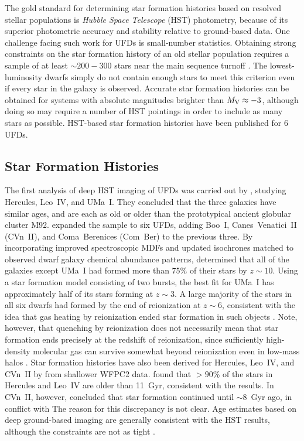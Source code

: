 \documentclass[a4paper]{ar-1col}
\begin{document}
The gold standard for determining star formation histories based on
resolved stellar populations is \emph{Hubble Space Telescope} (HST)
photometry, because of its superior photometric accuracy and stability
relative to ground-based data.  One challenge facing such work for
UFDs is small-number statistics.  Obtaining strong constraints on the
star formation history of an old stellar population requires a sample
of at least $\sim200-300$ stars near the main sequence turnoff
\citep{brown14}.  The lowest-luminosity dwarfs simply do not contain
enough stars to meet this criterion even if every star in the galaxy
is observed.  Accurate star formation histories can be obtained for
systems with absolute magnitudes brighter than $M_{{\rm V}} \approx
-3$, although doing so may require a number of HST pointings in order
to include as many stars as possible.  HST-based star formation
histories have been published for 6 UFDs.


\subsection{Star Formation Histories}

The first analysis of deep HST imaging of UFDs was carried out by
\citet{brown12}, studying Hercules, Leo~IV, and UMa~I.  They concluded
that the three galaxies have similar ages, and are each as old or
older than the prototypical ancient globular cluster M92.
\citet{brown14} expanded the sample to six UFDs, adding Boo~I,
Canes~Venatici~II (CVn~II), and Coma~Berenices (Com~Ber) to the
previous three.  By incorporating improved spectroscopic MDFs and
updated isochrones matched to observed dwarf galaxy chemical abundance
patterns, \citet{brown14} determined that all of the galaxies except
UMa~I had formed more than 75\% of their stars by $z \sim 10$.  Using
a star formation model consisting of two bursts, the best fit for
UMa~I has approximately half of its stars forming at $z \sim 3$.  A
large majority of the stars in all six dwarfs had formed by the end of
reionization at $z \sim 6$, consistent with the idea that gas heating
by reionization ended star formation in such objects
\citep[e.g.,][]{bullock00,somerville02,benson02}.  Note, however, that
quenching by reionization does not necessarily mean that star
formation ends precisely at the redshift of reionization, since
sufficiently high-density molecular gas can survive somewhat beyond
reionization even in low-mass halos \citep[e.g.,][]{onorbe15}.  Star
formation histories have also been derived for Hercules, Leo~IV, and
CVn~II by \citet{weisz14a} from shallower WFPC2 data.
\citeauthor{weisz14a} found that $>90$\% of the stars in Hercules and
Leo~IV are older than 11~Gyr, consistent with the \citet{brown14}
results.  In CVn~II, however, \citeauthor{weisz14a} concluded that
star formation continued until $\sim8$~Gyr ago, in conflict with
\citeauthor{brown14} The reason for this discrepancy is not clear.
Age estimates based on deep ground-based imaging are generally
consistent with the HST results, although the constraints are not as
tight \citep[e.g.,][]{sand10,okamoto12}.
\end{document}
